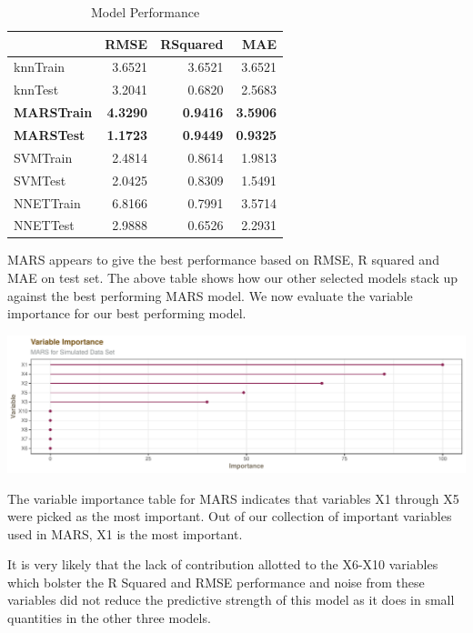 \documentclass[]{report}
\begin{document}
\begin{table}[H]

\caption{\label{tab:unnamed-chunk-1}Model Performance}
\centering
\fontsize{8}{10}\selectfont
\begin{tabular}[t]{l|r|r|r}
\hline
\textbf{ } & \textbf{RMSE} & \textbf{RSquared} & \textbf{MAE}\\
\hline
\rowcolor{gray!6}  knnTrain & 3.6521 & 3.6521 & 3.6521\\
\hline
knnTest & 3.2041 & 0.6820 & 2.5683\\
\hline
\rowcolor{gray!6}  \rowcolor[HTML]{d9f2e6}  \textbf{MARSTrain} & \textbf{4.3290} & \textbf{0.9416} & \textbf{3.5906}\\
\hline
\rowcolor[HTML]{d9f2e6}  \textbf{MARSTest} & \textbf{1.1723} & \textbf{0.9449} & \textbf{0.9325}\\
\hline
\rowcolor{gray!6}  SVMTrain & 2.4814 & 0.8614 & 1.9813\\
\hline
SVMTest & 2.0425 & 0.8309 & 1.5491\\
\hline
\rowcolor{gray!6}  NNETTrain & 6.8166 & 0.7991 & 3.5714\\
\hline
NNETTest & 2.9888 & 0.6526 & 2.2931\\
\hline
\end{tabular}
\end{table}

MARS appears to give the best performance based on RMSE, R squared and
MAE on test set. The above table shows how our other selected models
stack up against the best performing MARS model. We now evaluate the
variable importance for our best performing model.

\includegraphics{Homework-Two_files/figure-latex/kj-7.2-4b-1.pdf}

The variable importance table for MARS indicates that variables X1
through X5 were picked as the most important. Out of our collection of
important variables used in MARS, X1 is the most important.

It is very likely that the lack of contribution allotted to the X6-X10
variables which bolster the R Squared and RMSE performance and noise
from these variables did not reduce the predictive strength of this
model as it does in small quantities in the other three models.
\end{document}
